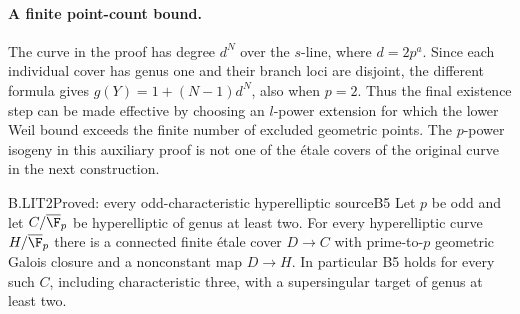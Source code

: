 \paragraph{A finite point-count bound.}
The curve in the proof has degree $d^N$ over the $s$-line, where
$d=2p^a$. Since each individual cover has genus one and their branch
loci are disjoint, the different formula gives
$g(Y)=1+(N-1)d^N$, also when $p=2$. Thus the final existence step
can be made effective by choosing an $l$-power extension for which
the lower Weil bound exceeds the finite number of excluded geometric
points. The $p$-power isogeny in this auxiliary proof is not one of
the \'etale covers of the original curve in the next construction.

\begin{claim}{B.LIT2}{Proved: every odd-characteristic hyperelliptic source}{B5}
Let $p$ be odd and let $C/\overline{\F}_p$ be hyperelliptic of genus
at least two. For every hyperelliptic curve $H/\overline{\F}_p$ there
is a connected finite \'etale cover $D\to C$ with prime-to-$p$
geometric Galois closure and a nonconstant map $D\to H$.
In particular B5 holds for every such $C$, including characteristic
three, with a supersingular target of genus at least two.
\end{claim}
